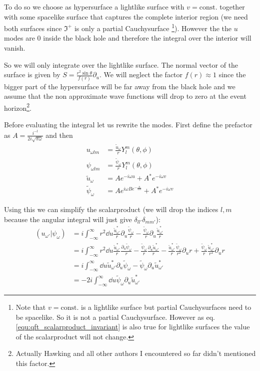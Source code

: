 To do so we choose as hypersurface a lightlike surface with \(v = \mathrm{const}.\) together with some spacelike surface that captures the complete interior region (we need both surfaces since \(\Im^+\) is only a partial Cauchysurface \footnote{Note that \(v = \mathrm{const}.\) is a lightlike surface but partial Cauchysurfaces need to be spacelike. So it is not a partial Cauchysurface. However as eq. \ref{equ:qft_scalarproduct_invariant} is also true for lightlike surfaces the value of the scalarproduct will not change.}). However the the \(u\) modes are \(0\) inside the black hole and therefore the integral over the interior will vanish.

So we will only integrate over the lightlike surface. The normal vector of the surface is given by \(S = \frac{r^2 \sin\theta}{f(r)} \partial_u\). We will neglect the factor \(f(r) \approx 1\) since the bigger part of the hypersurface will be far away from the black hole and we assume that the non approximate wave functions will drop to zero at the event horizon\footnote{Actually Hawking and all other authors I encountered so far didn't mentioned this factor.}.

Before evaluating the integral let us rewrite the modes. First define the prefactor as \(A = \frac{i^{-l}}{2i\sqrt{\pi\omega}}\) and then  
\begin{align}
u_{\omega l m} &= \frac{\tilde{u}_\omega}{r} Y_l^m (\theta, \phi)\\
\psi_{\omega l m} &= \frac{\tilde{\psi}_\omega}{r} Y_l^m (\theta, \phi)\\
\tilde{u}_{\omega} &= A e^{-i\omega u} + A^* e^{-i\omega v}\\
\tilde{\psi}_{\omega} &= A e^{i\omega B e^{-\frac{u}{4M}}} + A^* e^{-i\omega v}
\end{align}

Using this we can simplify the scalarproduct (we will drop the indices \(l, m\) because the angular integral will just give \(\delta_{ll'}\delta_{mm'}\)):
\begin{align}
(u_{\omega'}|\psi_\omega) &= i\int_{-\infty}^\infty r^2 \dd{u} \frac{\tilde{u}_{\omega'}^*}{r} \partial_u \frac{\tilde{\psi}_\omega}{r} - \frac{\tilde{\psi}_\omega}{r} \partial_u \frac{\tilde{u}_{\omega'}^*}{r}\\
	&= i\int_{-\infty}^\infty r^2 \dd{u} \frac{\tilde{u}_{\omega'}^*}{r} \frac{\partial_u \tilde{\psi}_\omega}{r} - \frac{\tilde{\psi}_\omega}{r} \frac{\partial_u \tilde{u}_{\omega'}^*}{r} - \frac{\tilde{u}_{\omega'}^*}{r} \frac{\tilde{\psi}_\omega}{r^2} \partial_u r + \frac{\tilde{\psi}_\omega}{r} \frac{\tilde{u}_{\omega'}^*}{r^2} \partial_u r\\
	&= i\int_{-\infty}^\infty \dd{u} \tilde{u}_{\omega'}^* \partial_u \tilde{\psi}_\omega - \tilde{\psi}_\omega \partial_u \tilde{u}_{\omega'}^*\\
	&= -2i\int_{-\infty}^\infty \dd{u} \tilde{\psi}_\omega \partial_u \tilde{u}_{\omega'}^*
\end{align}

